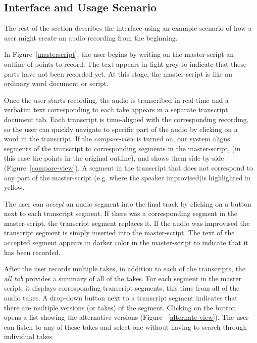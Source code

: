 \subsection{Interface and Usage Scenario}
The rest of the section describes the interface using an example scenario of how a user might create an audio recording from the beginning. 

In Figure~\ref{masterscript}, the user begins by writing on the master-script an outline  of points to record. The text appears in light grey to indicate that these parts have not been recorded yet. At this stage, the master-script is like an ordinary
word document or script. 

Once the user starts recording, the audio is transcribed in real time and a verbatim text corresponding to each take appears in a separate transcript document tab. Each transcript is time-aligned with the corresponding recording, so the user can quickly navigate to specific
part of the audio by clicking on a word in the transcript.  If the \textit{compare-view} is turned on, our system aligns segments of the transcript to corresponding segments in the master-script, (in this case the points in the original outline), and shows them side-by-side (Figure~\ref{compare-view}). A segment in the transcript that does not correspond to any part of the master-script (e.g. where the speaker improvised)is highlighted in yellow.


The user can \textit{accept} an audio segment into the final track
by clicking on a button next to each transcript segment. If there was
a corresponding  segment in the master-script, the transcript segment
replaces it. If the audio was improvised the transcript segment
is simply inserted into the master-script.
The text of the accepted segment appears in
darker color in the master-script to indicate that it has been recorded. 

After the user records multiple takes, in addition to each of the transcripts, the \textit{all tab} provides a summary of all of the takes. For each segment in the master script, it displays corresponding transcript segments, this time from all of the audio takes. A drop-down button next to a transcript segment  indicates that there are multiple versions (or takes)  of the  segment. Clicking on the button opens a
list showing the alternative versions (Figure ~\ref{alternate-view}). The user can listen to any of these takes and select one without having to search through individual takes. 

